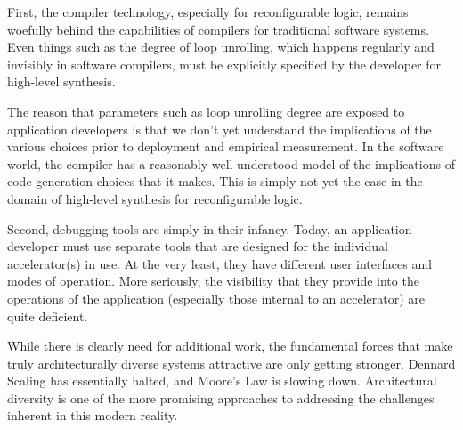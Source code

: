 First, the compiler technology, especially for reconfigurable logic,
remains woefully behind the capabilities of compilers for traditional
software systems.  Even things such as the degree of loop unrolling,
which happens regularly and invisibly in software compilers, must be
explicitly specified by the developer for high-level synthesis.

The reason that parameters such as loop unrolling degree are exposed
to application developers is that we don't yet understand the
implications of the various choices prior to deployment and empirical
measurement.  In the software world, the compiler has a reasonably
well understood model of the implications of code generation choices
that it makes.  This is simply not yet the case in the domain of
high-level synthesis for reconfigurable logic.

Second, debugging tools are simply in their infancy. Today, an
application developer must use separate tools that are designed
for the individual accelerator(s) in use.  At the very least, they
have different user interfaces and modes of operation.  More
seriously, the visibility that they provide into the operations
of the application (especially those internal to an accelerator)
are quite deficient.

While there is clearly need for additional work, the fundamental
forces that make truly architecturally diverse systems attractive
are only getting stronger.  Dennard Scaling has essentially halted,
and Moore's Law is slowing down.  Architectural diversity is one
of the more promising approaches to addressing the challenges
inherent in this modern reality.
